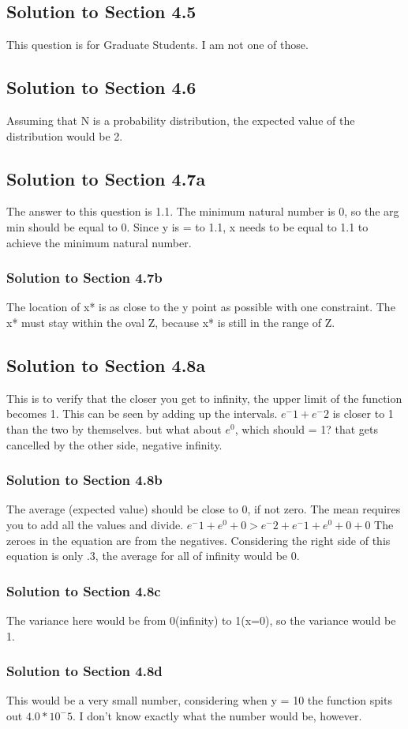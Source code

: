 \documentclass[a4paper]{article}
\begin{document}
\subsection{Solution to Section 4.5}
This question is for Graduate Students. I am not one of those.

\subsection{Solution to Section 4.6}
Assuming that N is a probability distribution, the expected value of the distribution would be 2.

\subsection{Solution to Section 4.7a}
The answer to this question is 1.1. The minimum natural number is 0, so the arg min should be equal to 0. Since y is = to 1.1, x needs to be equal to 1.1 to achieve the minimum natural number.

\subsubsection{Solution to Section 4.7b}
The location of x* is as close to the y point as possible with one constraint. The x* must stay within the oval Z, because x* is still in the range of Z.

\subsection{Solution to Section 4.8a}
This is to verify that the closer you get to infinity, the upper limit of the function becomes 1. This can be seen by adding up the intervals. $e^-1 +e^-2 $ is closer to 1 than the two by themselves. but what about $e^0$, which should = 1? that gets cancelled by the other side, negative infinity.

\subsubsection{Solution to Section 4.8b}
The average (expected value) should be close to 0, if not zero. The mean requires you to add all the values and divide. $e^-1 +e^0+0 > e^-2 +e^-1 +e^0+0+0$ The zeroes in the equation are from the negatives. Considering the right side of this equation is only .3, the average for all of infinity would be 0. 

\subsubsection{Solution to Section 4.8c}
The variance here would be from 0(infinity) to 1(x=0), so the variance would be 1.

\subsubsection{Solution to Section 4.8d}
This would be a very small number, considering when y = 10 the function spits out $4.0* 10^-5$. I don't know exactly what the number would be, however.
 
\end{document}
